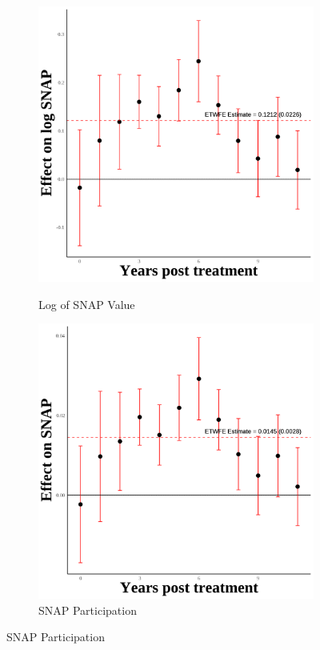 \documentclass[12pt,english]{article}
\begin{document}
\begin{figure}[H]
  \vspace{0.3cm} %

  \begin{subfigure}[b]{0.3\textwidth}
    \centering
    \caption{Log of SNAP Value}
    \includegraphics[width=\linewidth]{figures/plot44-ln_snap_event_study-secgen-wh.png}
    \label{fig:ln-snap-secgen-wh}
  \end{subfigure}
  \hfill
  \begin{subfigure}[b]{0.3\textwidth}
    \centering
    \caption{SNAP Participation}
    \includegraphics[width=\linewidth]{figures/plot45-snap_event_study-secgen-wh.png}

\end{subfigure}
\end{figure}
\end{document}
